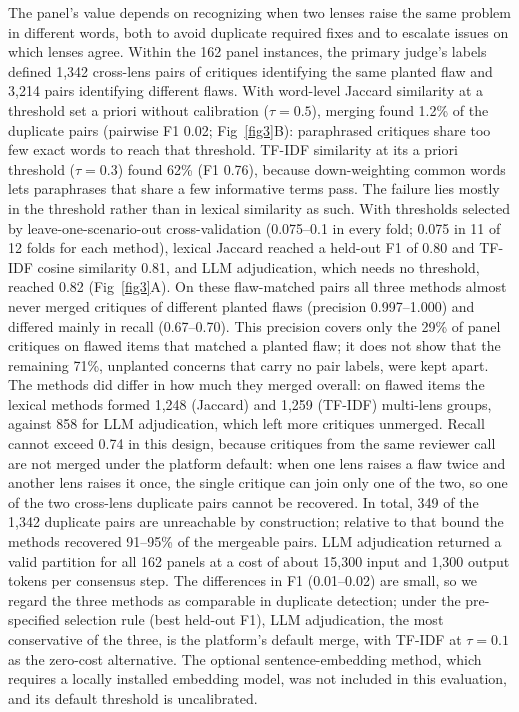 \documentclass[10pt,letterpaper]{article}
\begin{document}
The panel's value depends on recognizing when two lenses raise the same problem in different words, both to avoid duplicate required fixes and to escalate issues on which lenses agree. Within the 162 panel instances, the primary judge's labels defined 1,342 cross-lens pairs of critiques identifying the same planted flaw and 3,214 pairs identifying different flaws. With word-level Jaccard similarity at a threshold set a priori without calibration ($\tau=0.5$), merging found 1.2\% of the duplicate pairs (pairwise F1 0.02; Fig~\ref{fig3}B): paraphrased critiques share too few exact words to reach that threshold. TF-IDF similarity at its a priori threshold ($\tau=0.3$) found 62\% (F1 0.76), because down-weighting common words lets paraphrases that share a few informative terms pass. The failure lies mostly in the threshold rather than in lexical similarity as such. With thresholds selected by leave-one-scenario-out cross-validation (0.075--0.1 in every fold; 0.075 in 11 of 12 folds for each method), lexical Jaccard reached a held-out F1 of 0.80 and TF-IDF cosine similarity 0.81, and LLM adjudication, which needs no threshold, reached 0.82 (Fig~\ref{fig3}A). On these flaw-matched pairs all three methods almost never merged critiques of different planted flaws (precision 0.997--1.000) and differed mainly in recall (0.67--0.70). This precision covers only the 29\% of panel critiques on flawed items that matched a planted flaw; it does not show that the remaining 71\%, unplanted concerns that carry no pair labels, were kept apart. The methods did differ in how much they merged overall: on flawed items the lexical methods formed 1,248 (Jaccard) and 1,259 (TF-IDF) multi-lens groups, against 858 for LLM adjudication, which left more critiques unmerged. Recall cannot exceed 0.74 in this design, because critiques from the same reviewer call are not merged under the platform default: when one lens raises a flaw twice and another lens raises it once, the single critique can join only one of the two, so one of the two cross-lens duplicate pairs cannot be recovered. In total, 349 of the 1,342 duplicate pairs are unreachable by construction; relative to that bound the methods recovered 91--95\% of the mergeable pairs. LLM adjudication returned a valid partition for all 162 panels at a cost of about 15,300 input and 1,300 output tokens per consensus step. The differences in F1 (0.01--0.02) are small, so we regard the three methods as comparable in duplicate detection; under the pre-specified selection rule (best held-out F1), LLM adjudication, the most conservative of the three, is the platform's default merge, with TF-IDF at $\tau=0.1$ as the zero-cost alternative. The optional sentence-embedding method, which requires a locally installed embedding model, was not included in this evaluation, and its default threshold is uncalibrated.
\end{document}
